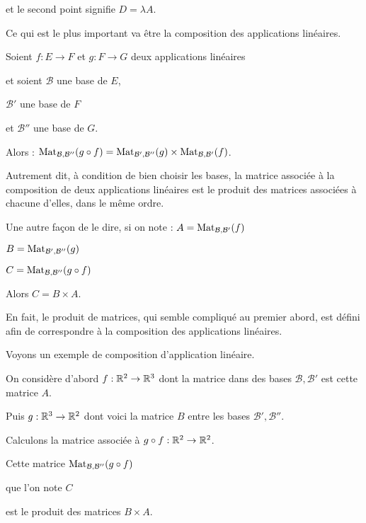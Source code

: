 \change
et le second point signifie $D = \lambda A$.



\diapo

Ce qui est le plus important va être la composition des applications linéaires.

\change
Soient $f : E \to F$  et $g : F \to G$ deux applications linéaires 

\change
et soient
$\mathcal{B}$ une base de $E$, 

$\mathcal{B}'$ une base de $F$

et $\mathcal{B}''$ une base de $G$.

\change
Alors :
$\mathop{\mathrm{Mat}}\nolimits_{\mathcal{B},\mathcal{B}''} (g \circ f)
= \mathop{\mathrm{Mat}}\nolimits_{\mathcal{B}',\mathcal{B}''} (g) \times \mathop{\mathrm{Mat}}\nolimits_{\mathcal{B},\mathcal{B}'} (f)$.

Autrement dit, à condition de bien choisir les bases, la matrice
associée à la composition de deux applications linéaires est le
produit des matrices associées à chacune d'elles, dans le même ordre.

\change
Une autre façon de le dire, si on note :
$A = \mathop{\mathrm{Mat}}\nolimits_{\mathcal{B},\mathcal{B}'} (f)$

$B = \mathop{\mathrm{Mat}}\nolimits_{\mathcal{B}',\mathcal{B}''} (g)$

$C = \mathop{\mathrm{Mat}}\nolimits_{\mathcal{B},\mathcal{B}''} (g \circ f)$

Alors $C = B\times A$.

En fait, le produit de matrices, qui semble compliqué au premier abord,
est défini afin de correspondre à la composition des applications linéaires.


\diapo

Voyons un exemple de composition d'application linéaire.

On considère d'abord 
$f : \mathbb{R}^2 \to \mathbb{R}^3$ 
dont la matrice dans des bases $\mathcal{B},\mathcal{B}'$
est cette matrice $A$.

\change
Puis $g : \mathbb{R}^3 \to \mathbb{R}^2$
dont voici la matrice $B$ entre les bases $\mathcal{B}',\mathcal{B}''$.

\change
Calculons la matrice associée à $g \circ f : \mathbb{R}^2 \to \mathbb{R}^2$.

\change
Cette matrice $\mathop{\mathrm{Mat}}\nolimits_{\mathcal{B},\mathcal{B}''} (g \circ f)$

\change
que l'on note $C$ 

\change
est le produit des matrices $B \times A$. 

